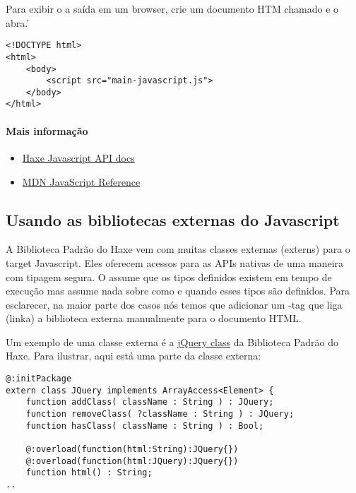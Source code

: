 Para exibir o a saída em um browser, crie um documento HTM chamado  e o abra.'

\begin{lstlisting}
<!DOCTYPE html>
<html>
	<body>
		<script src="main-javascript.js">
	</body>
</html>
\end{lstlisting}

\paragraph{Mais informação}

\begin{itemize}
	\item \href{http://api.haxe.org/js/}{Haxe Javascript API docs}
	\item \href{https://developer.mozilla.org/en-US/docs/Web/JavaScript/Reference}{MDN JavaScript Reference}
\end{itemize}

\subsection{Usando as bibliotecas externas do Javascript}
\label{target-javascript-external-libraries}

A Biblioteca Padrão do Haxe vem com muitas classes externas (externs) para o target Javascript. Eles oferecem acessos para as APIs nativas de uma maneira com tipagem segura.
O  assume que os tipos definidos existem em tempo de execução mas assume nada sobre como e quando esses tipos são definidos.
Para esclarecer, na maior parte dos casos nós temos que adicionar um -tag que liga (linka) a biblioteca externa manualmente para o documento HTML.

Um exemplo de uma classe externa é a \href{https://github.com/HaxeFoundation/haxe/blob/development/std/js/JQuery.hx#L83}{jQuery class} da Biblioteca Padrão do Haxe.
Para ilustrar, aqui está uma parte da classe externa:

\begin{lstlisting}
@:initPackage
extern class JQuery implements ArrayAccess<Element> {
	function addClass( className : String ) : JQuery;
	function removeClass( ?className : String ) : JQuery;
	function hasClass( className : String ) : Bool;
	
	@:overload(function(html:String):JQuery{})
	@:overload(function(html:JQuery):JQuery{})
	function html() : String;
..
\end{lstlisting}

